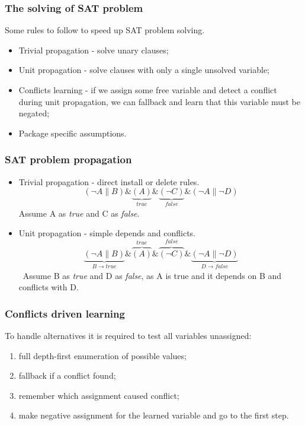 \documentclass{beamer}
\begin{document}
\begin{frame}
\frametitle{The solving of SAT problem}

Some rules to follow to speed up SAT problem solving.
\begin{itemize}
  \item Trivial propagation - solve unary clauses;
  \item Unit propagation - solve clauses with only a single unsolved variable;
  \item Conflicts learning - if we assign some free variable and detect a
  conflict during unit propagation, we can fallback and learn that this variable
  must be negated;
  \item Package specific assumptions. 
\end{itemize}
\end{frame}

\begin{frame}
\frametitle{SAT problem propagation}
\begin{itemize}
  \item Trivial propagation - direct install or delete rules.
  \bigskip
  \[
  (\neg A \| B) \& \underbrace{(A)}_{\textit{true}} \&
  \underbrace{(\neg C)}_{\textit{false}} \& (\neg A \| \neg D)
  \]
  \bigskip
  Assume A as \textit{true} and C as \textit{false}.
  \pause
  \item Unit propagation - simple depends and conflicts.
  \bigskip
  \[
  \underbrace{(\neg A \| B)}_{B \rightarrow \textit{true}} \& \overbrace{(A)}^{\textit{true}}
  \& \overbrace{(\neg C)}^{\textit{false}} \&
  \underbrace{(\neg A \| \neg D)}_{D \rightarrow \textit{false}}
  \]
  \
  Assume B as \textit{true} and D as \textit{false}, as A is true and it
  depends on B and conflicts with D.
\end{itemize}
\end{frame}

\begin{frame}
\frametitle{Conflicts driven learning}
To handle alternatives it is required to test all variables unassigned:
\begin{enumerate}
  \item full depth-first enumeration of possible values;
  \item fallback if a conflict found;
  \item remember which assignment caused conflict;
  \item make negative assignment for the learned variable and go to the first
  step.
\end{enumerate}
\end{frame}
\end{document}
